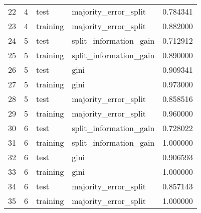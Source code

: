 \begin{tabular}{lrllr}
22 &      4 &          test &    majority\_error\_split &  0.784341 \\
23 &      4 &      training &    majority\_error\_split &  0.882000 \\
24 &      5 &          test &  split\_information\_gain &  0.712912 \\
25 &      5 &      training &  split\_information\_gain &  0.890000 \\
26 &      5 &          test &                    gini &  0.909341 \\
27 &      5 &      training &                    gini &  0.973000 \\
28 &      5 &          test &    majority\_error\_split &  0.858516 \\
29 &      5 &      training &    majority\_error\_split &  0.960000 \\
30 &      6 &          test &  split\_information\_gain &  0.728022 \\
31 &      6 &      training &  split\_information\_gain &  1.000000 \\
32 &      6 &          test &                    gini &  0.906593 \\
33 &      6 &      training &                    gini &  1.000000 \\
34 &      6 &          test &    majority\_error\_split &  0.857143 \\
35 &      6 &      training &    majority\_error\_split &  1.000000 \\
\bottomrule
\end{tabular}

